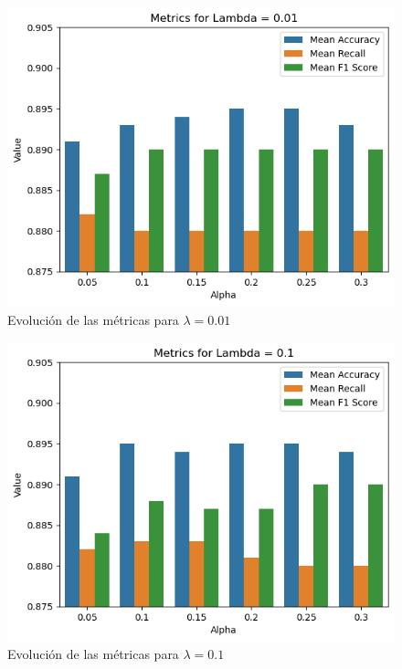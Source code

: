\documentclass[conference]{IEEEtran}
\begin{document}
\begin{figure}[ht]
    \centering
    \includegraphics[width=1\linewidth]{01.png}
    \caption{Evolución de las métricas para \(\lambda = 0.01\)}
    \label{fig:rlevolution01}
\end{figure}

\begin{figure}[ht]
    \centering
    \includegraphics[width=1\linewidth]{1.png}
    \caption{Evolución de las métricas para \(\lambda = 0.1\)}
    \label{fig:rlevolution1}
\end{figure}
\end{document}
